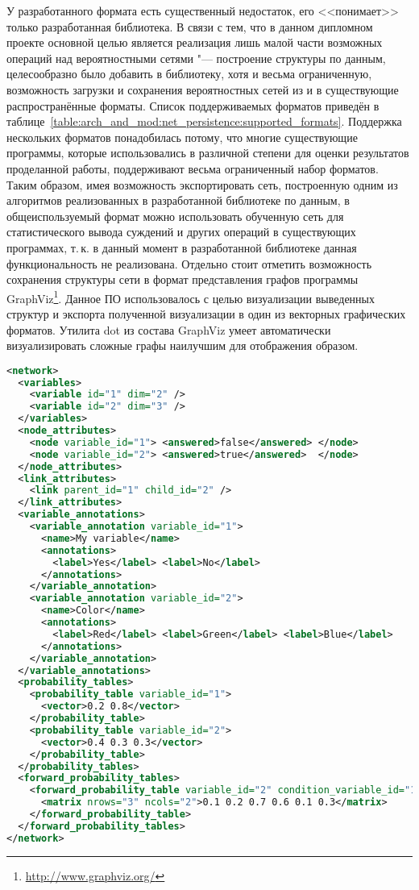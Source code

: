У разработанного формата есть существенный недостаток, его <<понимает>> только разработанная библиотека.
В связи с тем, что в данном дипломном проекте основной целью является реализация лишь малой части возможных операций над вероятностными сетями "--- построение структуры по данным, целесообразно было добавить в библиотеку, хотя и весьма ограниченную, возможность загрузки и сохранения вероятностных сетей из и в существующие распространённые форматы.
Список поддерживаемых форматов приведён в таблице~\ref{table:arch_and_mod:net_persistence:supported_formats}.
Поддержка нескольких форматов понадобилась потому, что многие существующие программы, которые использовались в различной степени для оценки результатов проделанной работы, поддерживают весьма ограниченный набор форматов.
Таким образом, имея возможность экспортировать сеть, построенную одним из алгоритмов реализованных в разработанной библиотеке по данным, в общеиспользуемый формат можно использовать обученную сеть для статистического вывода суждений и других операций в существующих программах, т.\,к. в данный момент в разработанной библиотеке данная функциональность не реализована.
Отдельно стоит отметить возможность сохранения структуры сети в формат представления графов программы GraphViz\footnote{\url{http://www.graphviz.org/}}.
Данное ПО использовалось с целью визуализации выведенных структур и экспорта полученной визуализации в один из векторных графических форматов.
Утилита dot из состава GraphViz умеет автоматически визуализировать сложные графы наилучшим для отображения образом.

\clearpage
\begin{lstlisting}[language=XML,caption={Пример представления простой вероятностной сети в собственном XML"=формате}, label=lst:arch_and_mod:net_persistence:bnxml]
<network>
  <variables>
    <variable id="1" dim="2" />
    <variable id="2" dim="3" />
  </variables>
  <node_attributes>
    <node variable_id="1"> <answered>false</answered> </node>
    <node variable_id="2"> <answered>true</answered>  </node>
  </node_attributes>
  <link_attributes>
    <link parent_id="1" child_id="2" />
  </link_attributes>
  <variable_annotations>
    <variable_annotation variable_id="1">
      <name>My variable</name>
      <annotations>
        <label>Yes</label> <label>No</label>
      </annotations>
    </variable_annotation>
    <variable_annotation variable_id="2">
      <name>Color</name>
      <annotations>
        <label>Red</label> <label>Green</label> <label>Blue</label>
      </annotations>
    </variable_annotation>
  </variable_annotations>
  <probability_tables>
    <probability_table variable_id="1">
      <vector>0.2 0.8</vector>
    </probability_table>
    <probability_table variable_id="2">
      <vector>0.4 0.3 0.3</vector>
    </probability_table>
  </probability_tables>
  <forward_probability_tables>
    <forward_probability_table variable_id="2" condition_variable_id="1">
      <matrix nrows="3" ncols="2">0.1 0.2 0.7 0.6 0.1 0.3</matrix>
    </forward_probability_table>
  </forward_probability_tables>
</network>
\end{lstlisting}

